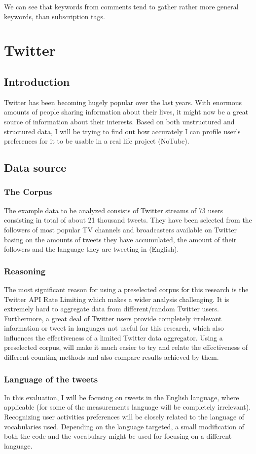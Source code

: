 \documentclass{article}
\begin{document}
We can see that keywords from comments tend to gather rather more general
keywords, than subscription tags.

\newpage
\section{Twitter}

\subsection{Introduction}
Twitter has been becoming hugely popular over the last years. With enormous amounts of people sharing information about their lives, it might now be a great source of information about their interests. Based on both unstructured and structured data, I will be trying to find out how accurately I can profile user's preferences for it to be usable in a real life project (NoTube).

\subsection{Data source}
\subsubsection{The Corpus}
The example data to be analyzed consists of Twitter streams of 73 users
consisting in total of about 21 thousand tweets. They have been selected from the followers of most popular TV channels and broadcasters available on Twitter basing on the amounts of tweets they have accumulated, the amount of their followers and the language they are tweeting in (English).

\subsubsection{Reasoning}
The most significant reason for using a preselected corpus for this research is
the Twitter API Rate Limiting which makes a wider analysis challenging. It is
extremely hard to aggregate data from different/random Twitter users.
Furthermore, a great deal of Twitter users provide completely irrelevant
information or tweet in languages not useful for this research, which also
influences the effectiveness of a limited Twitter data aggregator. Using a preselected corpus, will make it much easier to try and relate the effectiveness of different counting methods and also compare results achieved by them.

\subsubsection{Language of the tweets}
In this evaluation, I will be focusing on tweets in the English language, where
applicable (for some of the measurements language will be completely
    irrelevant). \\ Recognizing user activities preferences will be closely
related to the language of vocabularies used. Depending on the language
targeted, a small modification of both the code and the vocabulary might be used
for focusing on a different language.
\end{document}

